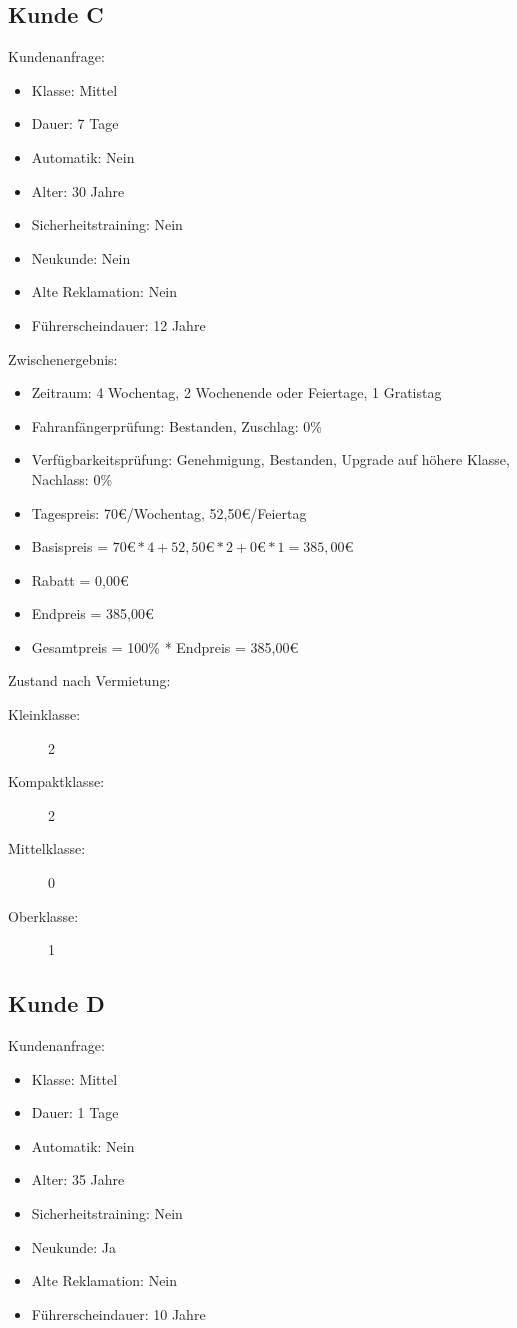 \subsection{Kunde C}

Kundenanfrage:
\begin{itemize}
	\item Klasse: Mittel
	\item Dauer: 7 Tage
	\item Automatik: Nein
	
	\item Alter: 30 Jahre
	\item Sicherheitstraining: Nein
	\item Neukunde: Nein
	\item Alte Reklamation: Nein
	\item Führerscheindauer: 12 Jahre
\end{itemize}

Zwischenergebnis:
\begin{itemize}
	\item Zeitraum: 4 Wochentag, 2 Wochenende oder Feiertage, 1 Gratistag
	\item Fahranfängerprüfung: Bestanden, Zuschlag: 0\%
	\item Verfügbarkeitsprüfung: Genehmigung, Bestanden, Upgrade auf höhere Klasse, Nachlass: 0\%
	\item Tagespreis: 70€/Wochentag, 52,50€/Feiertag
	\item Basispreis = $70€ * 4 + 52,50€ * 2 + 0€ * 1 = 385,00€$
	\item Rabatt = 0,00€
	\item Endpreis = 385,00€
	\item Gesamtpreis = 100\% * Endpreis = 385,00€
\end{itemize}

Zustand nach Vermietung:
\begin{description}
	\item[Kleinklasse:] 2
	\item[Kompaktklasse:] 2
	\item[Mittelklasse:] 0
	\item[Oberklasse:] 1
\end{description}

\subsection{Kunde D}

Kundenanfrage:
\begin{itemize}
	\item Klasse: Mittel
	\item Dauer: 1 Tage
	\item Automatik: Nein
	
	\item Alter: 35 Jahre
	\item Sicherheitstraining: Nein
	\item Neukunde: Ja
	\item Alte Reklamation: Nein
	\item Führerscheindauer: 10 Jahre
\end{itemize}

